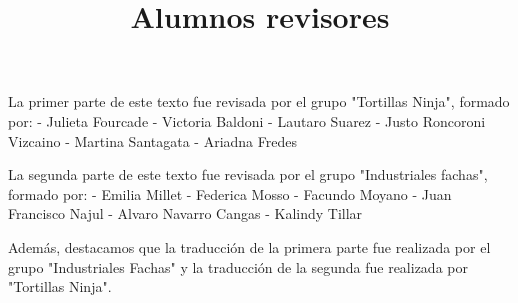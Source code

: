 \documentclass{article}
\begin{document}
\vspace{10mm}
\title{Alumnos revisores}
\item La primer parte de este texto fue revisada por el grupo "Tortillas Ninja", formado por:
- Julieta Fourcade
- Victoria Baldoni
- Lautaro Suarez
- Justo Roncoroni Vizcaino
- Martina Santagata
- Ariadna Fredes

\item La segunda parte de este texto fue revisada por el grupo "Industriales fachas", formado por:
- Emilia Millet
- Federica Mosso
- Facundo Moyano
- Juan Francisco Najul
- Alvaro Navarro Cangas
- Kalindy Tillar

\item Además, destacamos que la traducción de la primera parte fue realizada por el grupo "Industriales Fachas" y la traducción de la segunda fue realizada por "Tortillas Ninja".
\end{document}
